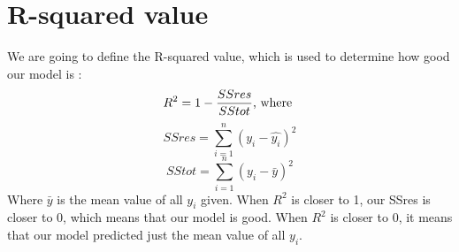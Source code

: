 \documentclass{article}
\begin{document}
\section{R-squared value}
We are going to define the R-squared value, which is used to determine how good our model is :
\begin{align*}
R^2 = 1 -  \frac{SSres \hfill}{SStot} \text{, where }
\end{align*}
\begin{equation*}
SSres = \sum_{i=1}^{n} (y_i - \hat{y_i}) ^ 2
\end{equation*}
\begin{equation*}
SStot = \sum_{i=1}^{n} (y_i - \bar{y}) ^ 2
\end{equation*}
Where $\bar{y}$ is the mean value of all $y_i$ given. When $R^2$ is closer to 1, our SSres is closer to 0, which means that our model is good. When $R^2$ is closer to 0, it means that our model predicted just the mean value of all $y_i$.
\end{document}
